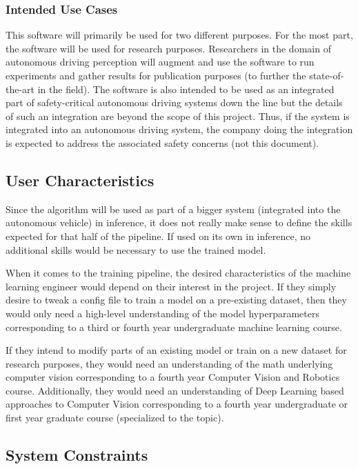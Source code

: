 \documentclass[12pt]{article}
\begin{document}
\subsubsection{Intended Use Cases}

This software will primarily be used for two different purposes. For the most part,
the software will be used for research purposes. Researchers in the domain of autonomous
driving perception will augment and use the software to run experiments and gather
results for publication purposes (to further the state-of-the-art in the field). The software
is also intended to be used as an integrated part of safety-critical autonomous driving systems
down the line but the details of such an integration are beyond the scope of this project.
Thus, if the system is integrated into an autonomous driving system, the company doing the 
integration is expected to address the associated safety concerns (not this document).

\subsection{User Characteristics} \label{SecUserCharacteristics}

Since the algorithm will be used as part of a bigger system (integrated into the 
autonomous vehicle) in inference, it does not really make sense to define the skills
expected for that half of the pipeline. If used on its own in inference, no additional
skills would be necessary to use the trained model.

When it comes to the training pipeline, the desired characteristics of the machine learning engineer would 
depend on their interest in the project. If they simply desire to tweak a config file to train a 
model on a pre-existing dataset, then they would only need a high-level understanding of the model 
hyperparameters corresponding to a third or fourth year undergraduate machine learning course. 

If they intend to modify parts of an existing model or train on a new dataset for research purposes,
they would need an understanding of the math underlying computer vision corresponding to a 
fourth year Computer Vision and Robotics course. Additionally, they would need an understanding
of Deep Learning based approaches to Computer Vision corresponding to a fourth year undergraduate
or first year graduate course (specialized to the topic). 


\subsection{System Constraints}
\end{document}
